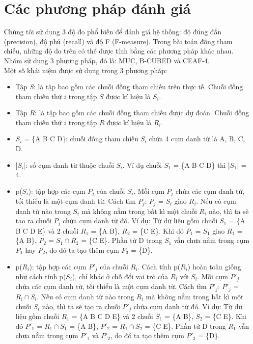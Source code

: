 \documentclass[12pt]{report}
\begin{document}
		\section{Các phương pháp đánh giá}			
				\par Chúng tôi sử dụng 3 độ đo phổ biến để đánh giá hệ thống: độ đúng đắn (precision), độ phủ (recall) và độ F (F-measure). Trong bài toán đồng tham chiếu, những độ đo trên có thể được tính bằng các phương pháp khác nhau. Nhóm sử dụng 3 phương pháp, đó là: MUC, B-CUBED và CEAF-4.
				\\Một số khái niệm được sử dụng trong 3 phương pháp:
					\begin{itemize}
						\item{Tập $S$: là tập bao gồm các chuỗi đồng tham chiếu trên thực tế. Chuỗi đồng tham chiếu thứ $i$ trong tập $S$ được kí hiệu là $S_i$.}
						\item{Tập $R$: là tập bao gồm các chuỗi đồng tham chiếu được dự đoán. Chuỗi đồng tham chiếu thứ $i$ trong tập $R$ được kí hiệu là $R_i$.}
						\item{$S_i$ = \{A B C D\}: chuỗi đồng tham chiếu $S_i$ chứa 4 cụm danh từ là A, B, C, D.}
						\item{|$S_i$|: số cụm danh từ thuộc chuỗi $S_i$. Ví dụ chuỗi $S_1$ = \{A B C D\} thì |$S_1$| = 4.}
						\item{p($S_i$): tập hợp các cụm $P_j$ của chuỗi $S_i$. Mỗi cụm $P_j$ chứa các cụm danh từ, tối thiểu là một cụm danh từ. Cách tìm $P_j$: $P_j$ = $S_i$ giao $R_i$. Nếu có cụm danh từ nào trong $S_i$ mà không nằm trong bất kì một chuỗi $R_i$ nào, thì ta sẽ tạo ra chuỗi $P_j$ chứa cụm danh từ đó. Ví dụ: Từ dữ liệu gồm chuỗi $S_1$ = \{A B C D E\} và 2 chuỗi $R_1$ = \{A B\}, $R_2$ = \{C E\}. Khi đó $P_1$ = $S_1$ giao $R_1$ = \{A B\}, $P_2$ = $S_1 \cap R_2$ = \{C E\}. Phần tử D trong $S_1$ vẫn chưa nằm trong cụm $P_1$ hay $P_2$, do đó ta tạo thêm cụm $P_3$ = \{D\}.}							
						\item p($R_i$): tập hợp các cụm $P'_j$ của chuỗi $R_i$. Cách tính p($R_i$) hoàn toàn giống như cách tính p($S_i$), chỉ khác ở chỗ đổi vai trò của $R_i$ với $S_i$. Mỗi cụm $P'_j$ chứa các cụm danh từ, tối thiểu là một cụm danh từ. Cách tìm $P'_j$: $P'_j$ = $R_i \cap S_i$. Nếu có cụm danh từ nào trong $R_i$ mà không nằm trong bất kì một chuỗi $S_i$ nào, thì ta sẽ tạo ra chuỗi $P'_j$ chứa cụm danh từ đó. Ví dụ: Từ dữ liệu gồm chuỗi $R_1$ = \{A B C D E\} và 2  chuỗi $S_1$ = \{A B\}, $S_2$ = \{C E\}. Khi đó $P'_1$ = $R_1 \cap S_1$ = \{A B\}, $P'_2$ = $R_1 \cap S_2$ = \{C E\}. Phần tử D trong $R_1$ vẫn chưa nằm trong cụm $P'_1$ và $P'_2$, do đó ta tạo thêm cụm $P'_3$ = \{D\}.
					\end{itemize}
\end{document}
